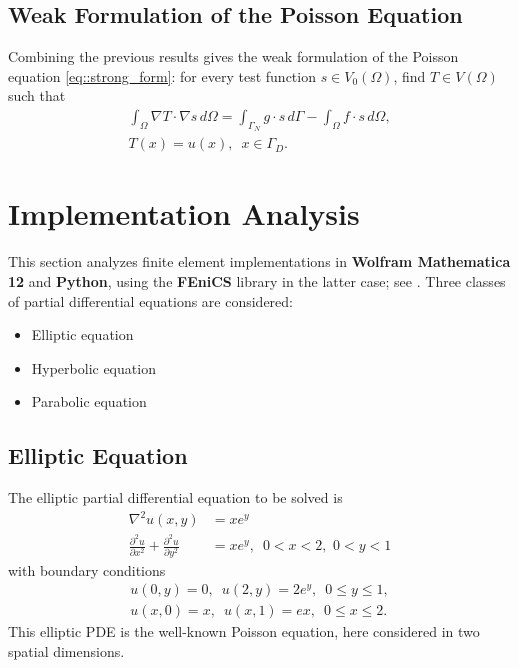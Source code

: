 \documentclass[a4paper]{article}
\begin{document}
\subsection{Weak Formulation of the Poisson Equation}
Combining the previous results gives the weak formulation of the Poisson equation \ref{eq::strong_form}: for every test function $s\in V_0(\Omega)$, find $T\in V(\Omega)$ such that
\begin{equation}
\begin{aligned}\label{eq::Poisson_weak_formulation}
\int_{\Omega} \nabla T\cdot \nabla s \, d\Omega= \int_{\Gamma_N}g\cdot s \, d\Gamma-\int_{\Omega}f\cdot s\,d\Omega,\\
T(x)=u(x),\,\,\,x\in\Gamma_D.
\end{aligned}
\end{equation}
\section{Implementation Analysis}
This section analyzes finite element implementations in \textbf{Wolfram Mathematica 12} and \textbf{Python}, using the \textbf{FEniCS} library in the latter case; see \cite{FEniCS}. Three classes of partial differential equations are considered:
\begin{itemize}
\item Elliptic equation
\item Hyperbolic equation
\item Parabolic equation

\end{itemize}
\subsection{Elliptic Equation}
The elliptic partial differential equation to be solved is
\begin{equation}\label{eq::elliptic_pde}
\begin{aligned}
\nabla^2 u(x,y)&=x e^y\\
\frac{\partial ^2 u}{\partial x^2}+\frac{\partial ^2 u}{\partial y^2}&=x e^y, \,\,\, 0<x<2,\,\,0<y<1
\end{aligned}
\end{equation}
with boundary conditions
\begin{equation}
\begin{aligned}
u(0,y)=0,\,\,\,u(2,y)=2e^y,\,\,\,0\leq y\leq 1,\\
u(x,0)=x,\,\,\,u(x,1)=ex,\,\,\,0\leq x\leq 2.
\end{aligned}
\end{equation}
This elliptic PDE is the well-known Poisson equation, here considered in two spatial dimensions.\\
\end{document}
